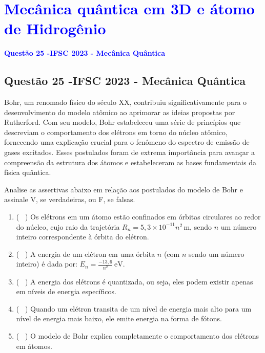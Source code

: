 \section{\large \textcolor{blue}{Mecânica quântica em 3D e átomo de Hidrogênio}}

\begin{flushleft}
\textbf{\textcolor{blue}{\Large Quest\~ao 25 -IFSC 2023 - Mecânica Quântica}}\\
\noindent

\subsection{Quest\~ao 25 -IFSC 2023 - Mecânica Quântica}

Bohr, um renomado f\'isico do s\'eculo XX, contribuiu significativamente para o desenvolvimento do modelo at\^omico ao aprimorar as ideias propostas por Rutherford. Com seu modelo, Bohr estabeleceu uma s\'erie de princ\'ipios que descreviam o comportamento dos el\'etrons em torno do n\'ucleo at\^omico, fornecendo uma explica\c{c}\~ao crucial para o fen\^omeno do espectro de emiss\~ao de gases excitados. Esses postulados foram de extrema import\^ancia para avan\c{c}ar a compreens\~ao da estrutura dos \'atomos e estabeleceram as bases fundamentais da f\'isica qu\^antica. 

Analise as assertivas abaixo em rela\c{c}\~ao aos postulados do modelo de Bohr e assinale V, se verdadeiras, ou F, se falsas.

\begin{enumerate}
    \item ( \ ) Os el\'etrons em um \'atomo est\~ao confinados em \'orbitas circulares ao redor do n\'ucleo, cujo raio da trajet\'oria $R_n = 5,3 \times 10^{-11} n^2\,\text{m}$, sendo $n$ um n\'umero inteiro correspondente \`a \'orbita do el\'etron.
    \item ( \ ) A energia de um el\'etron em uma \'orbita $n$ (com $n$ sendo um n\'umero inteiro) \'e dada por: $E_n = \frac{-13,6}{n^2} \ \text{eV}$.
    \item ( \ ) A energia dos el\'etrons \'e quantizada, ou seja, eles podem existir apenas em n\'iveis de energia espec\'ificos.
    \item ( \ ) Quando um el\'etron transita de um n\'ivel de energia mais alto para um n\'ivel de energia mais baixo, ele emite energia na forma de f\'otons.
    \item ( \ ) O modelo de Bohr explica completamente o comportamento dos el\'etrons em \'atomos.
\end{enumerate}


\end{flushleft}
